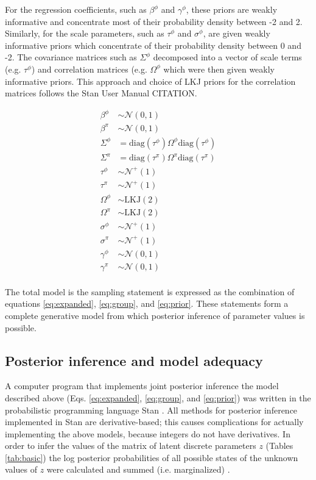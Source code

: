 \documentclass[12pt,letterpaper]{article}
\begin{document}
For the regression coefficients, such as \(\beta^{\phi}\) and \(\gamma^{\phi}\), these priors are weakly informative and concentrate most of their probability density between -2 and 2. Similarly, for the scale parameters, such as \(\tau^{\phi}\) and \(\sigma^{\phi}\), are given weakly informative priors which concentrate of their probability density between 0 and -2. The covariance matrices such as \(\Sigma^{\phi}\) decomposed into a vector of scale terms (e.g. \(\tau^{\phi}\)) and correlation matrices (e.g. \(\Omega^{\phi}\) which were then given weakly informative priors. This approach and choice of LKJ priors for the correlation matrices follows the Stan User Manual CITATION.


\begin{equation}
  \begin{aligned}
    \beta^{\phi} &\sim \mathcal{N}(0, 1) \\
    \beta^{\pi} &\sim \mathcal{N}(0, 1) \\
    \Sigma^{\phi} &= \text{diag}(\tau^{\phi}) \Omega^{\phi} \text{diag}(\tau^{\phi}) \\
    \Sigma^{\pi} &= \text{diag}(\tau^{\pi}) \Omega^{\pi} \text{diag}(\tau^{\pi}) \\
    \tau^{\phi} &\sim \mathcal{N}^{+}(1) \\
    \tau^{\pi} &\sim \mathcal{N}^{+}(1) \\
    \Omega^{\phi} &\sim \text{LKJ}(2) \\
    \Omega^{\pi} &\sim \text{LKJ}(2) \\
    \sigma^{\phi} &\sim \mathcal{N}^{+}(1) \\
    \sigma^{\pi} &\sim \mathcal{N}^{+}(1) \\
    \gamma^{\phi} &\sim \mathcal{N}(0, 1) \\
    \gamma^{\pi} &\sim \mathcal{N}(0, 1) \\
  \end{aligned}
  \label{eq:prior}
\end{equation}

The total model is the sampling statement is expressed as the combination of equations \ref{eq:expanded}, \ref{eq:group}, and \ref{eq:prior}. These statements form a complete generative model from which posterior inference of parameter values is possible.



\subsection*{Posterior inference and model adequacy}
A computer program that implements joint posterior inference the model described above (Eqs. \ref{eq:expanded}, \ref{eq:group}, and \ref{eq:prior}) was written in the probabilistic programming language Stan \citep{StanDevelopmentTeam2016}. All methods for posterior inference implemented in Stan are derivative-based; this causes complications for actually implementing the above models, because integers do not have derivatives. In order to infer the values of the matrix of latent discrete parameters \(z\) (Tables \ref{tab:basic}) the log posterior probabilities of all possible states of the unknown values of \(z\) were calculated and summed (i.e. marginalized) \citep{StanDevelopmentTeam2016}. 
\end{document}

